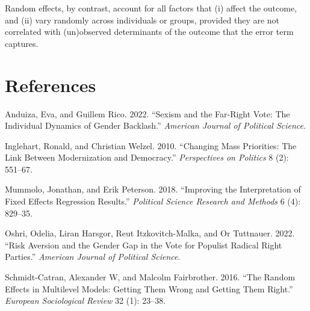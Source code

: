 \documentclass[
]{article}
\newlength{\cslhangindent}
\newlength{\cslentryspacingunit} %
\newenvironment{CSLReferences}[2] %
 {%
  \setlength{\parindent}{0pt}
  \ifodd #1
  \let\oldpar\par
  \def\par{\hangindent=\cslhangindent\oldpar}
  \fi
  \setlength{\parskip}{#2\cslentryspacingunit}
 }%
 {}
\begin{document}
Random effects, by contrast, account for all factors that (i) affect the
outcome, and (ii) vary randomly across individuals or groups, provided
they are not correlated with (un)observed determinants of the outcome
that the error term captures.

\FloatBarrier

\hypertarget{references}{%
\section*{References}\label{references}}

\hypertarget{refs}{}
\begin{CSLReferences}{1}{0}
\leavevmode{}%
Anduiza, Eva, and Guillem Rico. 2022. {``Sexism and the Far-Right Vote:
The Individual Dynamics of Gender Backlash.''} \emph{American Journal of
Political Science}.

\leavevmode{}%
Inglehart, Ronald, and Christian Welzel. 2010. {``Changing Mass
Priorities: The Link Between Modernization and Democracy.''}
\emph{Perspectives on Politics} 8 (2): 551--67.

\leavevmode{}%
Mummolo, Jonathan, and Erik Peterson. 2018. {``Improving the
Interpretation of Fixed Effects Regression Results.''} \emph{Political
Science Research and Methods} 6 (4): 829--35.

\leavevmode{}%
Oshri, Odelia, Liran Harsgor, Reut Itzkovitch-Malka, and Or Tuttnauer.
2022. {``Risk Aversion and the Gender Gap in the Vote for Populist
Radical Right Parties.''} \emph{American Journal of Political Science}.

\leavevmode{}%
Schmidt-Catran, Alexander W, and Malcolm Fairbrother. 2016. {``The
Random Effects in Multilevel Models: Getting Them Wrong and Getting Them
Right.''} \emph{European Sociological Review} 32 (1): 23--38.

\end{CSLReferences}
\end{document}
